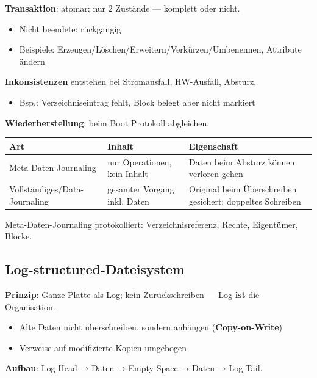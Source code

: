\documentclass[11pt, a4paper]{article}
\begin{document}
\textbf{Transaktion}: atomar; nur 2 Zustände — komplett oder nicht.

\begin{itemize}
  \item Nicht beendete: rückgängig
  \item Beispiele: Erzeugen/Löschen/Erweitern/Verkürzen/Umbenennen, Attribute ändern
\end{itemize}

\textbf{Inkonsistenzen} entstehen bei Stromausfall, HW-Ausfall, Absturz.

\begin{itemize}
  \item Bsp.: Verzeichniseintrag fehlt, Block belegt aber nicht markiert
\end{itemize}

\textbf{Wiederherstellung}: beim Boot Protokoll abgleichen.



{\small
\begin{tabularx}{\linewidth}{XXX}
\hline
\rowcolor{tableheadbg}
{\color{white}\textbf{Art}} & {\color{white}\textbf{Inhalt}} & {\color{white}\textbf{Eigenschaft}} \\[2pt]
\hline
\endhead
\hline
\endfoot
Meta-Daten-Journaling & nur Operationen, kein Inhalt & Daten beim Absturz können verloren gehen \\
Vollständiges/Data-Journaling & gesamter Vorgang inkl. Daten & Original beim Überschreiben gesichert; doppeltes Schreiben \\
\end{tabularx}
}


Meta-Daten-Journaling protokolliert: Verzeichnisreferenz, Rechte, Eigentümer, Blöcke.



\subsection{Log-structured-Dateisystem}

\textbf{Prinzip}: Ganze Platte als Log; kein Zurückschreiben — Log \textbf{ist} die Organisation.

\begin{itemize}
  \item Alte Daten nicht überschreiben, sondern anhängen (\textbf{Copy-on-Write})
  \item Verweise auf modifizierte Kopien umgebogen
\end{itemize}

\textbf{Aufbau}: Log Head → Daten → Empty Space → Daten → Log Tail.
\end{document}
